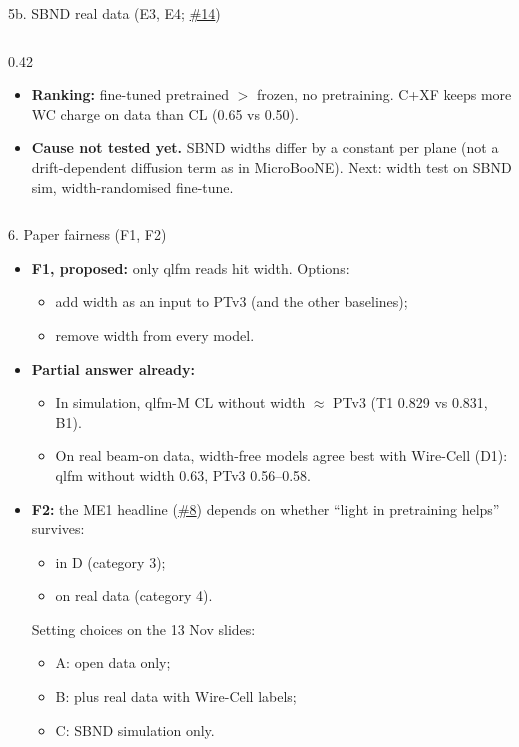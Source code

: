 \documentclass[aspectratio=169,10pt]{beamer}
\newcommand{\gh}{https://github.com/HaiwangYu/fm4npp-lartpc}
\newcommand{\iss}[1]{\href{\gh/issues/#1}{\color{blue!60!black}\##1}}
\begin{document}
\begin{frame}{5b. SBND real data (E3, E4; \iss{14})}
\begin{columns}[T]
\begin{column}{0.42\textwidth}
\begin{itemize}
        \item \textbf{Ranking:} fine-tuned pretrained $>$ frozen, no pretraining. C+XF keeps more WC charge on data than CL (0.65 vs 0.50).
        \item \textbf{Cause not tested yet.} SBND widths differ by a constant per plane (not a drift-dependent diffusion term as in MicroBooNE). Next: width test on SBND sim, width-randomised fine-tune.
      \end{itemize}
    \end{column}
  \end{columns}
\end{frame}

\begin{frame}{6. Paper fairness (F1, F2)}
  \footnotesize
  \begin{itemize}\setlength{\itemsep}{6pt}
    \item \textbf{F1, proposed:} only qlfm reads hit width. Options:
      \begin{itemize}
        \item add width as an input to PTv3 (and the other baselines);
        \item remove width from every model.
      \end{itemize}
    \item \textbf{Partial answer already:}
      \begin{itemize}
        \item In simulation, qlfm-M CL without width $\approx$ PTv3 (T1 0.829 vs 0.831, B1).
        \item On real beam-on data, width-free models agree best with Wire-Cell (D1): qlfm without width 0.63, PTv3 0.56--0.58.
      \end{itemize}
    \item \textbf{F2:} the ME1 headline (\iss{8}) depends on whether ``light in pretraining helps'' survives:
      \begin{itemize}
        \item in D (category 3);
        \item on real data (category 4).
      \end{itemize}
      Setting choices on the 13 Nov slides:
      \begin{itemize}
        \item A: open data only;
        \item B: plus real data with Wire-Cell labels;
        \item C: SBND simulation only.
      \end{itemize}
  \end{itemize}
\end{frame}
\end{document}
